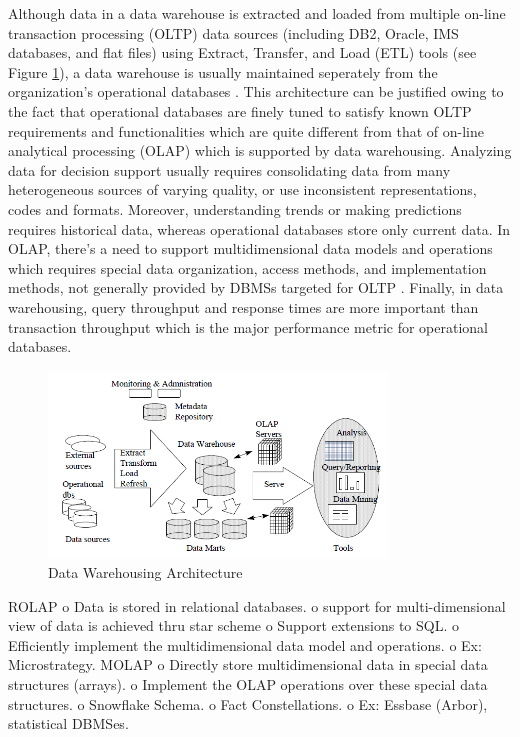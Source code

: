 \documentclass[12pt,a4paper]{article}
\begin{document}
Although data in a data warehouse is extracted and loaded from multiple on-line transaction processing (OLTP) data sources (including DB2, Oracle, IMS databases, and flat files) using Extract, Transfer, and Load (ETL) tools (see Figure \ref{fig:dw}), a data warehouse is usually maintained seperately from the organization's operational databases \cite{sen2005comparison, 248616}. This architecture can be justified owing to the fact that operational databases are finely tuned to satisfy known OLTP requirements and functionalities which are quite different from that of on-line analytical processing (OLAP) which is supported by data warehousing. Analyzing data for decision support usually requires consolidating data from many heterogeneous sources of varying quality, or use inconsistent representations, codes and formats. Moreover, understanding trends or making predictions requires historical data, whereas operational databases store only current data. In OLAP, there's a need to support multidimensional data models and operations which requires special data organization, access methods, and implementation methods, not generally provided by DBMSs targeted for OLTP \cite{248616}. Finally, in data warehousing, query throughput and response times are more important than transaction throughput which is the major performance metric for operational databases.

\begin{figure}[!t]
\centering
\includegraphics[width=9cm]{figs/dw.png}
\caption{Data Warehousing Architecture \cite{248616}}
\label{fig:dw}
\end{figure}


\cite{Cheung20011}
ROLAP
          o Data is stored in relational databases.
          o support for multi-dimensional view of data is achieved thru star scheme
          o Support extensions to SQL.
          o Efficiently implement the multidimensional data model and operations.
          o Ex: Microstrategy.
MOLAP
          o Directly store multidimensional data in special data structures (arrays).
          o Implement the OLAP operations over these special data structures.
          o Snowflake Schema. \cite{kimball2009data}
          o Fact Constellations.
          o Ex: Essbase (Arbor), statistical DBMSes.
\end{document}
